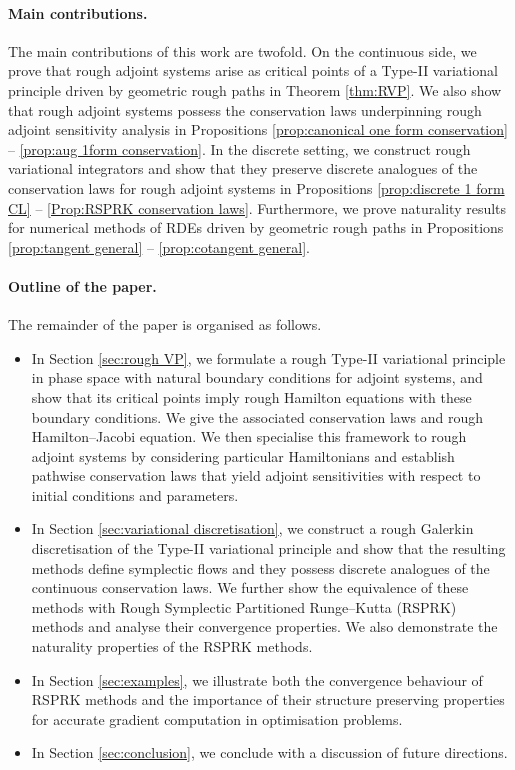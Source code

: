 \documentclass[11pt, oneside]{article}
\numberwithin{equation}{section}
\theoremstyle{definition}
\begin{document}
\paragraph{Main contributions.}
The main contributions of this work are twofold. On the continuous side, we prove that rough adjoint systems arise as critical points of a Type-II variational principle driven by geometric rough paths in Theorem \ref{thm:RVP}. We also show that rough adjoint systems possess the conservation laws underpinning rough adjoint sensitivity analysis in Propositions \ref{prop:canonical one form conservation} -- \ref{prop:aug 1form conservation}. In the discrete setting, we construct rough variational integrators and show that they preserve discrete analogues of the conservation laws for rough adjoint systems in Propositions \ref{prop:discrete 1 form CL} -- \ref{Prop:RSPRK conservation laws}. Furthermore, we prove naturality results for numerical methods of RDEs driven by geometric rough paths in Propositions \ref{prop:tangent general} -- \ref{prop:cotangent general}.

\paragraph{Outline of the paper.}
The remainder of the paper is organised as follows.
\begin{itemize}
    \item In Section \ref{sec:rough VP}, we formulate a rough Type-II variational principle in phase space with natural boundary conditions for adjoint systems, and show that its critical points imply rough Hamilton equations with these boundary conditions. We give the associated conservation laws and rough Hamilton--Jacobi equation. We then specialise this framework to rough adjoint systems by considering particular Hamiltonians and establish pathwise conservation laws that yield adjoint sensitivities with respect to initial conditions and parameters.
    \item In Section \ref{sec:variational discretisation}, we construct a rough Galerkin discretisation of the Type-II variational principle and show that the resulting methods define symplectic flows and they possess discrete analogues of the continuous conservation laws. We further show the equivalence of these methods with Rough Symplectic Partitioned Runge--Kutta (RSPRK) methods and analyse their convergence properties. We also demonstrate the naturality properties of the RSPRK methods.
    \item In Section \ref{sec:examples}, we illustrate both the convergence behaviour of RSPRK methods and the importance of their structure preserving properties for accurate gradient computation in optimisation problems.
    \item In Section \ref{sec:conclusion}, we conclude with a discussion of future directions.
\end{itemize}
\end{document}
